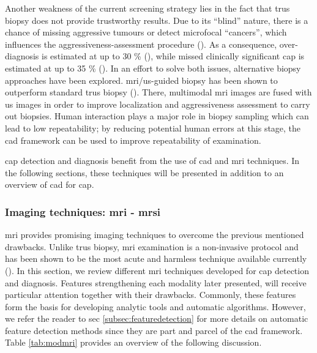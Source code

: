 Another weakness of the current screening strategy lies in the fact that \ac{trus} biopsy does not provide trustworthy results. Due to its ``blind'' nature, there is a chance of missing aggressive tumours or detect microfocal ``cancers'', which influences the aggressiveness-assessment procedure (\cite{Noguchi2001}). As a consequence, over-diagnosis is estimated at up to 30 \% (\cite{Haas2007}), while missed clinically significant \ac{cap} is estimated at up to 35 \% (\cite{Taira2010}). In an effort to solve both issues, alternative biopsy approaches have been explored. \ac{mri}/\ac{us}-guided biopsy has been shown to outperform standard \ac{trus} biopsy (\cite{Delongchamps2013}). There, multimodal \ac{mri} images are fused with \ac{us} images in order to improve localization and aggressiveness assessment to carry out biopsies. Human interaction plays a major role in biopsy sampling which can lead to low repeatability; by reducing potential human errors at this stage, the \acs{cad} framework can be used to improve repeatability of examination.

\ac{cap} detection and diagnosis benefit from the use of \acs{cad} and \ac{mri} techniques. In the following sections, these techniques will be presented in addition to an overview of \acs{cad} for \ac{cap}.

\subsubsection{Imaging techniques: \ac{mri} - \ac{mrsi}} \label{subsubsec:mrimrsi}

\ac{mri} provides promising imaging techniques to overcome the previous mentioned drawbacks. Unlike \ac{trus} biopsy, \ac{mri} examination is a non-invasive protocol and has been shown to be the most acute and harmless technique available currently (\cite{Turkbey2012}).
In this section, we review different \ac{mri} techniques developed for \ac{cap} detection and diagnosis. Features strengthening each modality later presented, will receive particular attention together with their drawbacks. Commonly, these features form the basis for developing analytic tools and automatic algorithms. However, we refer the reader to \acs{sec} \ref{subsec:featuredetection} for more details on automatic feature detection methods since they are part and parcel of the \acs{cad} framework. Table \ref{tab:modmri} provides an overview of the following discussion.

